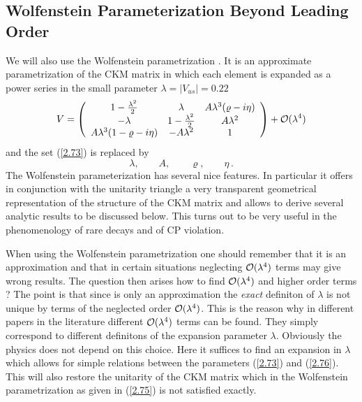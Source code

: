 \subsection{Wolfenstein Parameterization Beyond Leading Order}
            \label{sec:sewm:wolfparam}
We will also use the Wolfenstein parametrization
\cite{wolfenstein:83}.
It is an approximate parametrization of the CKM matrix in which
each element is expanded as a power series in the small parameter
$\lambda=| V_{us}|=0.22$
\begin{equation}\label{2.75} 
V=
\left(\begin{array}{ccc}
1-{\lambda^2\over 2}&\lambda&A\lambda^3(\varrho-i\eta)\\ -\lambda&
1-{\lambda^2\over 2}&A\lambda^2\\ A\lambda^3(1-\varrho-i\eta)&-A\lambda^2&
1\end{array}\right)
+{\cal O}(\lambda^4)
\end{equation}
and the set (\ref{2.73}) is replaced by
\begin{equation}\label{2.76}
\lambda, \qquad A, \qquad \varrho, \qquad \eta \, .
\end{equation}
The Wolfenstein parameterization
has several nice features. In particular it offers in conjunction with the
unitarity triangle a very transparent geometrical
representation of the structure of the CKM matrix and allows to derive
several analytic results to be discussed below. This turns out to be very
useful in the phenomenology of rare decays and of CP violation.

When using the Wolfenstein parametrization one should remember that it
is an approximation and that in certain situations neglecting
${\cal O}(\lambda^4)$ terms may give wrong results. The question then
arises how to find ${\cal O}(\lambda^4)$ and higher order terms ?  The
point is that since  is only an approximation the {\em exact}
definiton of $\lambda$ is not unique by terms of the neglected order
${\cal O}(\lambda^4)$. This is the reason why in different papers in the
literature different ${\cal O}(\lambda^4)$ terms can be found. They simply
correspond to different definitons of the expansion parameter
$\lambda$.  Obviously the physics does not depend on this choice.  Here
it suffices to find an expansion in $\lambda$ which allows for simple
relations between the parameters (\ref{2.73}) and (\ref{2.76}).  This
will also restore the unitarity of the CKM matrix which in the
Wolfenstein parametrization as given in (\ref{2.75}) is not satisfied
exactly.

